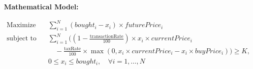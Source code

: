 \documentclass{article}
\begin{document}
\textbf{Mathematical Model:}

\begin{align*}
\text{Maximize} \quad & \sum_{i=1}^{N} (bought_i - x_i) \times futurePrice_i \\
\text{subject to} \quad & \sum_{i=1}^{N} \Bigg( (1 - \frac{\text{transactionRate}}{100}) \times x_i \times currentPrice_i \\
& \quad - \frac{\text{taxRate}}{100} \times \max(0, x_i \times currentPrice_i - x_i \times buyPrice_i) \Bigg) \geq K, \\
& 0 \leq x_i \leq bought_i, \quad \forall i = 1, \ldots, N
\end{align*}
\end{document}
